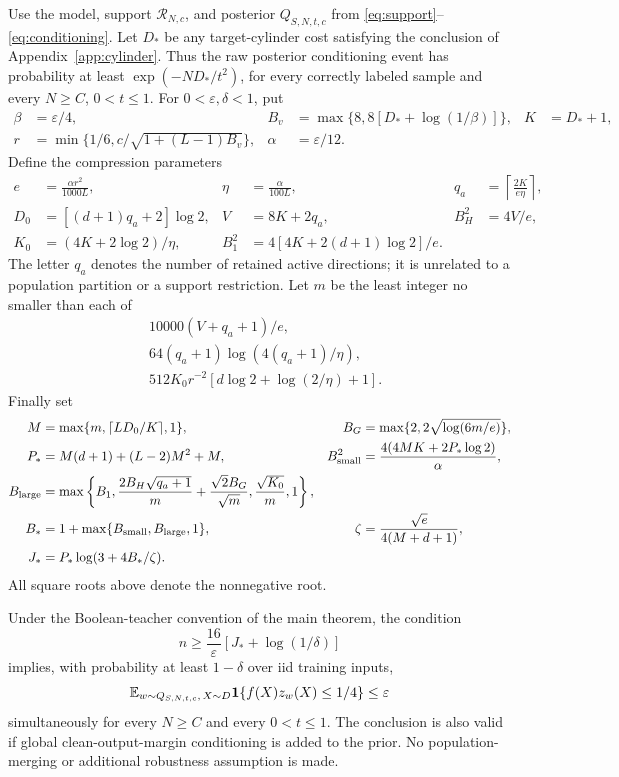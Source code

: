 Use the model, support $\mathcal R_{N,c}$, and posterior
$Q_{S,N,t,c}$ from \eqref{eq:support}--\eqref{eq:conditioning}.
Let $D_*$ be any target-cylinder cost satisfying the conclusion of
Appendix~\ref{app:cylinder}. Thus the raw posterior conditioning event
has probability at least $\exp(-ND_*/t^2)$, for every correctly labeled
sample and every $N\ge C$, $0<t\le1$. For
$0<\varepsilon,\delta<1$, put
\begin{align*}
 \beta&=\varepsilon/4,&
 B_v&=\max\{8,8[D_*+\log(1/\beta)]\},&
 K&=D_*+1,\\
 r&=\min\{1/6,c/\sqrt{1+(L-1)B_v}\},&
 \alpha&=\varepsilon/12.
\end{align*}
Define the compression parameters
\begin{align*}
 e&=\frac{\alpha r^2}{1000L},&
 \eta&=\frac{\alpha}{100L},&
 q_a&=\left\lceil\frac{2K}{e\eta}\right\rceil,\\
 D_0&=[(d+1)q_a+2]\log2,&
 V&=8K+2q_a,&
 B_H^2&=4V/e,\\
 K_0&=(4K+2\log2)/\eta,&
 B_1^2&=4[4K+2(d+1)\log2]/e.
\end{align*}
The letter $q_a$ denotes the number of retained active directions; it
is unrelated to a population partition or a support restriction.
Let $m$ be the least integer no smaller than each of
\begin{align*}
 &10000(V+q_a+1)/e,\\
 &64(q_a+1)\log(4(q_a+1)/\eta),\\
 &512K_0r^{-2}[d\log2+\log(2/\eta)+1].
\end{align*}
Finally set
\begin{align*}
 M&=\max\{m,\lceil LD_0/K\rceil,1\},&
 B_G&=\max\{2,2\sqrt{\log(6m/e)}\},\\
 P_*&=M(d+1)+(L-2)M^2+M,&
 B_{\rm small}^2&=\frac{4(4MK+2P_*\log2)}\alpha,\\
 B_{\rm large}&=\max\left\{
 B_1,\frac{2B_H\sqrt{q_a+1}}m+\frac{\sqrt2 B_G}{\sqrt m},
 \frac{\sqrt{K_0}}m,1\right\},\\
 B_*&=1+\max\{B_{\rm small},B_{\rm large},1\},&
 \zeta&=\frac{\sqrt e}{4(M+d+1)},\\
 J_*&=P_*\log(3+4B_*/\zeta).
\end{align*}
All square roots above denote the nonnegative root.

\begin{theorem}
\label{thm:all-scales-sequential}
Under the Boolean-teacher convention of the main theorem, the condition
\begin{equation}\label{eq:all-scales-sequential-budget}
 n\ge\frac{16}{\varepsilon}\left[J_*+\log(1/\delta)\right]
\end{equation}
implies, with probability at least $1-\delta$ over iid training inputs,
\[
 \mathbb E_{w\sim Q_{S,N,t,c},\,X\sim D}
     \mathbf1\{f(X)z_w(X)\le1/4\}\le\varepsilon
\]
simultaneously for every $N\ge C$ and every $0<t\le1$.
The conclusion is also valid if global clean-output-margin conditioning
is added to the prior. No population-merging or additional robustness
assumption is made.
\end{theorem}

